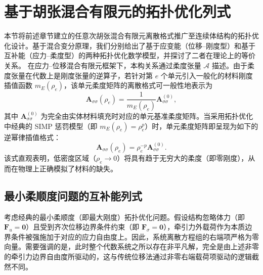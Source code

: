 \section{基于胡张混合有限元的拓扑优化列式}
\label{sec:hz_top_opt_formulation}

本节将前述章节建立的任意次胡张混合有限元离散格式推广至连续体结构的拓扑优化设计。基于混合变分原理，我们分别给出了基于应变能（位移--刚度型）和基于互补能（应力--柔度型）的两种拓扑优化数学模型，并探讨了二者在理论上的等价关系。
在应力--位移混合有限元框架下，本构关系通过柔度张量 $\mathcal{A}$ 描述。由于柔度张量在代数上是刚度张量的逆算子，若针对第 $e$ 个单元引入一般化的材料刚度插值函数 $m_E(\rho_e)$，该单元柔度矩阵的离散格式可一般性地表示为
\[
\boldsymbol{A}_{\sigma\sigma}(\rho_e) = \frac{1}{m_E(\rho_e)} \boldsymbol{A}_{\sigma\sigma}^{(0)},
\]
其中 $\boldsymbol{A}_{\sigma\sigma}^{(0)}$ 为完全由实体材料填充时对应的单元基准柔度矩阵。当采用拓扑优化中经典的 SIMP 惩罚模型（即 $m_E(\rho_e) = \rho_e^p$）时，单元柔度矩阵即呈现为如下的逆幂律插值格式：
\[
\boldsymbol{A}_{\sigma\sigma}(\rho_e) = \rho_e^{-p} \boldsymbol{A}_{\sigma\sigma}^{(0)}.
\]
该式直观表明，低密度区域（$\rho_e \to 0$）将具有趋于无穷大的柔度（即零刚度），从而在物理上正确模拟了材料的缺失。


\subsection{最小柔顺度问题的互补能列式}
\label{subsec:hz_topopt_baseline_compliance}

考虑经典的最小柔顺度（即最大刚度）拓扑优化问题。假设结构忽略体力（即 $\boldsymbol{F}_u=\boldsymbol{0}$）且受到齐次位移边界条件约束（即 $\boldsymbol{F}_\sigma=\boldsymbol{0}$），牵引力外载荷作为本质边界条件被强施加于对应的应力自由度上。因此，系统离散方程组的右端项严格为零向量。需要强调的是，此时整个代数系统之所以存在非平凡解，完全是由上述非零的牵引力边界自由度所驱动的，这与传统位移法通过非零右端载荷项驱动的逻辑截然不同。

